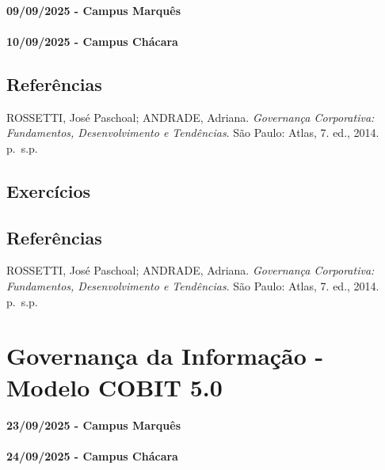 \documentclass[
]{book}
\begin{document}
\subsubsection*{09/09/2025 - Campus Marquês}\label{campus-marquuxeas-5}

\subsubsection*{10/09/2025 - Campus Chácara}\label{campus-chuxe1cara-5}

\section{Referências}\label{referuxeancias-5}

ROSSETTI, José Paschoal; ANDRADE, Adriana. \emph{Governança Corporativa: Fundamentos, Desenvolvimento e Tendências}. São Paulo: Atlas, 7. ed., 2014. p.~s.p.

\section{Exercícios}\label{exercuxedcios-4}

\section{Referências}\label{referuxeancias-6}

ROSSETTI, José Paschoal; ANDRADE, Adriana. \emph{Governança Corporativa: Fundamentos, Desenvolvimento e Tendências}. São Paulo: Atlas, 7. ed., 2014. p.~s.p.

\chapter{Governança da Informação - Modelo COBIT 5.0}\label{governanuxe7a-da-informauxe7uxe3o---modelo-cobit-5.0}

\subsubsection*{23/09/2025 - Campus Marquês}\label{campus-marquuxeas-6}

\subsubsection*{24/09/2025 - Campus Chácara}\label{campus-chuxe1cara-6}
\end{document}
